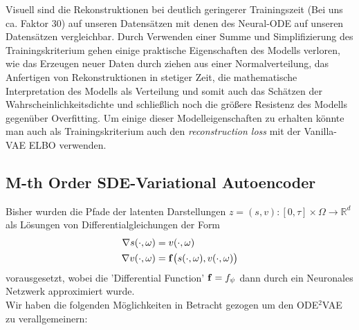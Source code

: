 \documentclass[12pt]{article}
\newcommand{\R}{\mathbb{R}}
\newcommand{\bbf}{\bold{f}}
\begin{document}
	Visuell sind die Rekonstruktionen bei deutlich geringerer Trainingszeit (Bei uns ca. Faktor 30) auf unseren Datensätzen mit denen des Neural-ODE auf unseren Datensätzen vergleichbar.
	Durch Verwenden einer Summe und Simplifizierung des Trainingskriterium gehen einige praktische Eigenschaften des Modells verloren, wie das Erzeugen neuer Daten durch ziehen aus einer Normalverteilung, das Anfertigen von Rekonstruktionen in stetiger Zeit, die mathematische Interpretation des Modells als Verteilung und somit auch das Schätzen der Wahrscheinlichkeitsdichte und schließlich noch die größere Resistenz des Modells gegenüber Overfitting.
	Um einige dieser Modelleigenschaften zu erhalten könnte man auch als Trainingskriterium auch den \emph{reconstruction loss} mit der Vanilla-VAE ELBO verwenden.


	\newpage
	\subsection[SDE$^M$VAE]{M-th Order SDE-Variational Autoencoder}
	Bisher wurden die Pfade der latenten Darstellungen $z = (s,v) : [0,\tau] \times \Omega \rightarrow \R^d$ als Lösungen von Differentialgleichungen der Form
	\begin{align*}
	\nabla s(\cdot,\omega) &= v(\cdot,\omega)\\
	\nabla v(\cdot,\omega) &= \bbf\big(s(\cdot,\omega),v(\cdot,\omega)\big)
	\end{align*}
	vorausgesetzt, wobei die 'Differential Function' $\bbf = f_\psi$ dann durch ein Neuronales Netzwerk approximiert wurde.\\
	Wir haben die folgenden Möglichkeiten in Betracht gezogen um den ODE$^2$VAE zu verallgemeinern:
\end{document}
